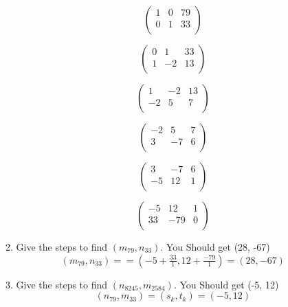 \documentclass[11pt]{article}
\begin{document}
\begin{enumerate}
\begin{enumerate}
\begin{equation*}
\left(
\begin{array}{ccc}
 1 & 0 & 79 \\
 0 & 1 & 33 \\
\end{array}
\right)
\end{equation*}

\begin{equation*}
\left(
\begin{array}{ccc}
 0 & 1 & 33 \\
 1 & -2 & 13 \\
\end{array}
\right)
\end{equation*}

\begin{equation*}
\left(
\begin{array}{ccc}
 1 & -2 & 13 \\
 -2 & 5 & 7 \\
\end{array}
\right)
\end{equation*}

\begin{equation*}
\left(
\begin{array}{ccc}
 -2 & 5 & 7 \\
 3 & -7 & 6 \\
\end{array}
\right)
\end{equation*}

\begin{equation*}
\left(
\begin{array}{ccc}
 3 & -7 & 6 \\
 -5 & 12 & 1 \\
\end{array}
\right)
\end{equation*}

\begin{equation*}
\left(
\begin{array}{ccc}
 -5 & 12 & 1 \\
 33 & -79 & 0 \\
\end{array}
\right)
\end{equation*}



\item Give the steps to find $(m_{79}, n_{33})$.  You Should get (28, -67)
\\
$$(m_{79}, n_{33}) = = (-5 + \tfrac{33}{1}, 12 + \tfrac{-79}{1}) = (28, -67)$$
\item Give the steps to find $(n_{8245}, m_{2584})$.  You Should get (-5, 12)
\\
$$(n_{79}, m_{33}) = (s_k, t_k) = (-5, 12)$$
\end{enumerate}


\end{enumerate}
\end{document}
